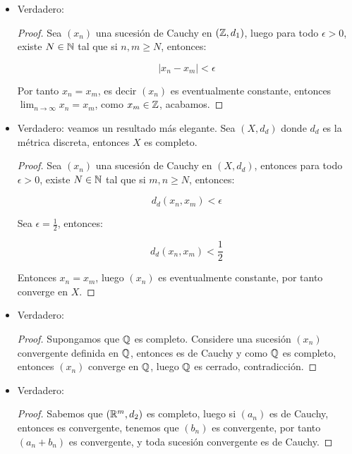 \begin{itemize}[label={✎},leftmargin=*]
    \item Verdadero:\\

    \begin{proof}
        Sea $(x_n)$ una sucesión de Cauchy en $(\mathbb{Z},d_1)$, luego para todo $\epsilon>0$, existe $N\in \mathbb{N}$ tal que si $n,m\geq N$, entonces:

        $$|x_n-x_m|<\epsilon$$

        Por tanto $x_n=x_m$, es decir $(x_n)$ es eventualmente constante, entonces $\lim_{n \to \infty} x_n=x_m$, como $x_m \in \mathbb{Z}$, acabamos.
    \end{proof}

    \item Verdadero: veamos un resultado más elegante. Sea $(X,d_d)$ donde $d_d$ es la métrica discreta, entonces $X$ es completo.\\

    \begin{proof}
        Sea $(x_n)$ una sucesión de Cauchy en $(X,d_d)$, entonces para todo $\epsilon>0$, existe $N\in\mathbb{N}$ tal que si $m,n\geq N$, entonces:

        $$d_d(x_n,x_m)<\epsilon$$

        Sea $\epsilon=\frac{1}{2}$, entonces:

        $$d_d(x_n,x_m)<\frac{1}{2}$$

        Entonces $x_n=x_m$, luego $(x_n)$ es eventualmente constante, por tanto converge en $X$.
    \end{proof}

    \item Verdadero:\\

    \begin{proof}
        Supongamos que $\mathbb{Q}$ es completo. Considere una sucesión $(x_n)$ convergente definida en $\mathbb{Q}$, entonces es de Cauchy y como $\mathbb{Q}$ es completo, entonces $(x_n)$ converge en $\mathbb{Q}$, luego $\mathbb{Q}$ es cerrado, contradicción.
    \end{proof} 

    \item Verdadero:\\ 

    \begin{proof}
        Sabemos que $(\mathbb{R}^m,d_2)$ es completo, luego si $(a_n)$ es de Cauchy, entonces es convergente, tenemos que $(b_n)$ es convergente, por tanto $(a_n+b_n)$ es convergente, y toda sucesión convergente es de Cauchy.
    \end{proof}


\end{itemize}
